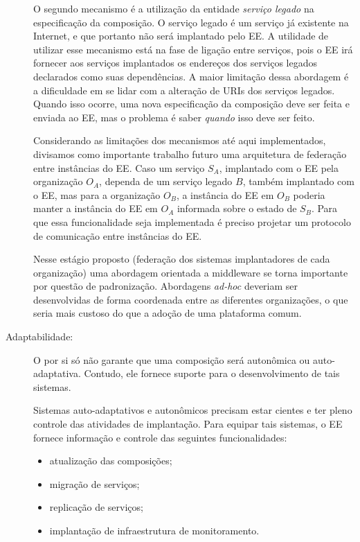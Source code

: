 \begin{description}
O segundo mecanismo é a utilização da entidade \emph{serviço legado} na especificação da composição.
O serviço legado é um serviço já existente na Internet, e que portanto
não será implantado pelo EE.
A utilidade de utilizar esse mecanismo está na fase de ligação
entre serviços, pois o EE irá fornecer
aos serviços implantados os endereços dos serviços legados declarados como suas dependências.
A maior limitação dessa abordagem é a dificuldade em se lidar com a alteração de URIs
dos serviços legados.
Quando isso ocorre, uma nova especificação da composição deve ser feita e enviada ao EE,
mas o problema é saber \emph{quando} isso deve ser feito.

Considerando as limitações dos mecanismos até aqui implementados,
divisamos como importante trabalho futuro uma arquitetura de federação entre instâncias do EE.
Caso um serviço $S_A$, implantado com o EE pela organização $O_A$, dependa de um serviço legado $B$,
também implantado com o EE, mas para a organização $O_B$, a instância do EE em $O_B$ poderia
manter a instância do EE em $O_A$ informada sobre o estado de $S_B$.
Para que essa funcionalidade seja implementada é preciso projetar um protocolo
de comunicação entre instâncias do EE.

Nesse estágio proposto (federação dos sistemas implantadores de cada organização) uma abordagem
orientada a middleware se torna importante por questão de padronização.
Abordagens \emph{ad-hoc} deveriam ser desenvolvidas de forma coordenada entre as diferentes organizações,
o que seria mais custoso do que a adoção de uma plataforma comum.

\item [Adaptabilidade:]

O \ee por si só não garante que uma composição será autonômica ou auto-adaptativa.
Contudo, ele fornece suporte para o desenvolvimento de tais sistemas.

Sistemas auto-adaptativos e autonômicos precisam estar cientes
e ter pleno controle das atividades de implantação.
Para equipar tais sistemas, o EE fornece informação e controle
das seguintes funcionalidades:

\begin{itemize}
\item atualização das composições;
\item migração de serviços;
\item replicação de serviços;
\item implantação de infraestrutura de monitoramento.
\end{itemize}


\end{description}
